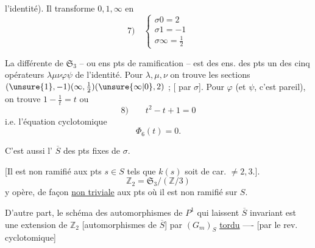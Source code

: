 
l'identité). Il transforme $0,1,\infty$ en
\[
7)\quad\left\{\begin{array}{l}\sigma0=2\\\sigma1=-1\\\sigma\infty=\tfrac12\end{array}\right.
\]

La différente de $\mathfrak S_3$ -- ou ens pts de ramification -- est  des ens. des pts  un des cinq opérateurs $\lambda\mu\nu\varphi\psi$  de l'identité. Pour $\lambda,\mu,\nu$ on trouve les sections $(\unsure{1},-1)(\infty,\tfrac12)(\unsure{\infty|0},2)$ ; [ par $\sigma$]. Pour $\varphi$ (et $\psi$, c'est pareil), on trouve $1-\frac1t=t$ ou
\[
8)\qquad t^2-t+1=0
\]
i.e. l'équation cyclotomique
\[
\boxed{\Phi_6(t)=0}.
\]


C'est aussi l' $\overline S$ des pts fixes de $\sigma$.

[Il est non ramifié  aux pts $s\in S$ tels que $k(s)$ soit de car. $\ne2,3$.].
\[
\mathbb Z_2=\mathfrak S_3/(\mathbb Z/3)
\]
y opère, de façon \uline{non triviale} aux pts où il est non ramifié sur $S$.

D'autre part, le schéma  des automorphismes de $P^1$ qui laissent $\overline S$  invariant est une extension de $\mathbb Z_2$ [automorphismes de $\overline S$] par $(G_m)_S$ \uline{tordu} ---- [par le rev. cyclotomique]
